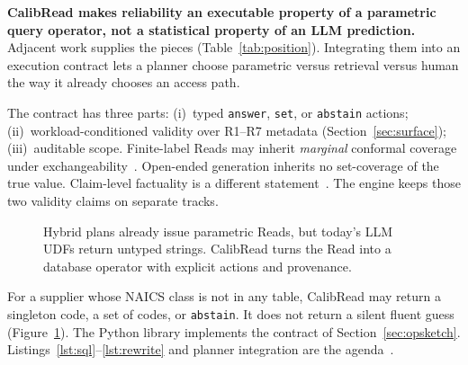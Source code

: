 \documentclass[sigconf, nonacm]{acmart}
\begin{document}
\textbf{CalibRead makes reliability an executable property of a parametric query operator, not a statistical property of an LLM prediction.} Adjacent work supplies the pieces (Table~\ref{tab:position}). Integrating them into an execution contract lets a planner choose parametric versus retrieval versus human the way it already chooses an access path.

The contract has three parts: (i)~typed \texttt{answer}, \texttt{set}, or \texttt{abstain} actions; (ii)~workload-conditioned validity over R1--R7 metadata (Section~\ref{sec:surface}); (iii)~auditable scope. Finite-label Reads may inherit \emph{marginal} conformal coverage under exchangeability~\cite{vovk2005algorithmic}. Open-ended generation inherits no set-coverage of the true value. Claim-level factuality is a different statement~\cite{mohri2024language,wang2024conu}. The engine keeps those two validity claims on separate tracks.

\begin{figure}[t]
  \centering
  \CalibReadFigMotivation
  \caption{Hybrid plans already issue parametric Reads, but today's LLM UDFs return untyped strings. CalibRead turns the Read into a database operator with explicit actions and provenance.}
  \label{fig:motivation}
\end{figure}

For a supplier whose NAICS class is not in any table, CalibRead may return a singleton code, a set of codes, or \texttt{abstain}. It does not return a silent fluent guess (Figure~\ref{fig:motivation}). The Python library implements the contract of Section~\ref{sec:opsketch}. Listings~\ref{lst:sql}--\ref{lst:rewrite} and planner integration are the agenda~\cite{lee2025sic}.
\end{document}
